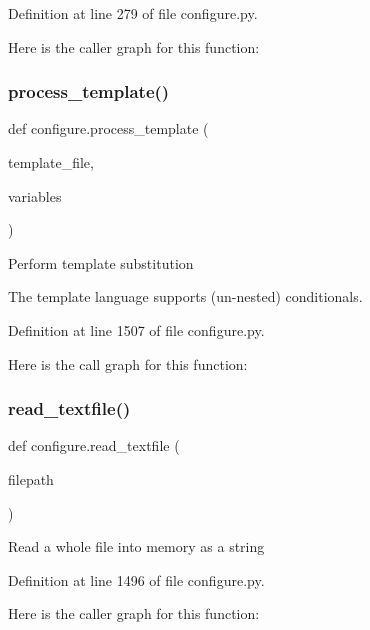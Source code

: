 Definition at line 279 of file configure.\+py.

Here is the caller graph for this function\+:
\mbox{\label{namespaceconfigure_a0131813b774dd002d783ca87f2f4f5ce}} 
\subsubsection{\texorpdfstring{process\+\_\+template()}{process\_template()}}
{\footnotesize\ttfamily def configure.\+process\+\_\+template (\begin{DoxyParamCaption}\item[{}]{template\+\_\+file,  }\item[{}]{variables }\end{DoxyParamCaption})}

\begin{DoxyVerb}Perform template substitution

The template language supports (un-nested) conditionals.
\end{DoxyVerb}
 

Definition at line 1507 of file configure.\+py.

Here is the call graph for this function\+:
\mbox{\label{namespaceconfigure_a759d51888d7834a21084790c8e819889}} 
\subsubsection{\texorpdfstring{read\+\_\+textfile()}{read\_textfile()}}
{\footnotesize\ttfamily def configure.\+read\+\_\+textfile (\begin{DoxyParamCaption}\item[{}]{filepath }\end{DoxyParamCaption})}

\begin{DoxyVerb}Read a whole file into memory as a string
\end{DoxyVerb}
 

Definition at line 1496 of file configure.\+py.

Here is the caller graph for this function\+:
\mbox{\label{namespaceconfigure_a755a51474db2ecab893bd674b15bc677}} 
